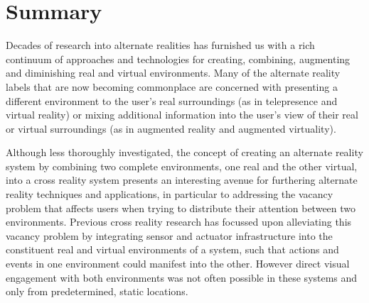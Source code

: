 






\section{Summary}
Decades of research into alternate realities has furnished us with a rich continuum of approaches and technologies for creating, combining, augmenting and diminishing real and virtual environments. Many of the alternate reality labels that are now becoming commonplace are concerned with presenting a different environment to the user's real surroundings (as in telepresence and virtual reality) or mixing additional information into the user's view of their real or virtual surroundings (as in augmented reality and augmented virtuality).

Although less thoroughly investigated, the concept of creating an alternate reality system by combining two complete environments, one real and the other virtual, into a cross reality system presents an interesting avenue for furthering alternate reality techniques and applications, in particular to addressing the vacancy problem that affects users when trying to distribute their attention between two environments. Previous cross reality research has focussed upon alleviating this vacancy problem by integrating sensor and actuator infrastructure into the constituent real and virtual environments of a system, such that actions and events in one environment could manifest into the other. However direct visual engagement with both environments was not often possible in these systems and only from predetermined, static locations.

